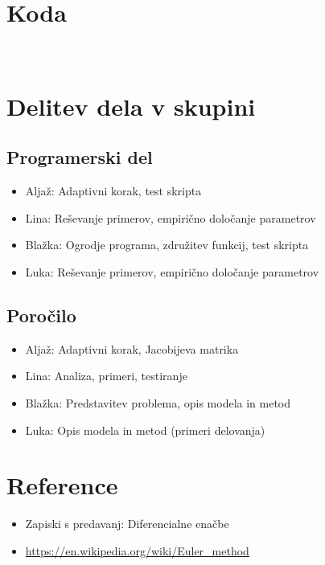 \documentclass[12pt]{article}
\begin{document}
	\newpage
	\section{Koda}
	\begin{lstlisting}[language=Octave]
	
	\end{lstlisting}
	\newpage
	\section{Delitev dela v skupini}
	\subsection{Programerski del}
	\begin{itemize}
		\item Aljaž: Adaptivni korak, test skripta
		\item Lina: Reševanje primerov, empirično določanje parametrov
		\item Blažka: Ogrodje programa, združitev funkcij, test skripta
		\item Luka: Reševanje primerov, empirično določanje parametrov
	\end{itemize}
	\subsection{Poročilo}
	\begin{itemize}
		\item Aljaž: Adaptivni korak, Jacobijeva matrika
		\item Lina: Analiza, primeri, testiranje
		\item Blažka: Predstavitev problema, opis modela in metod
		\item Luka: Opis modela in metod (primeri delovanja)
	\end{itemize}
	\section{Reference}
	\begin{itemize}
		\item Zapiski s predavanj: Diferencialne enačbe
		\item \url{https://en.wikipedia.org/wiki/Euler_method}
	\end{itemize}
\end{document}
